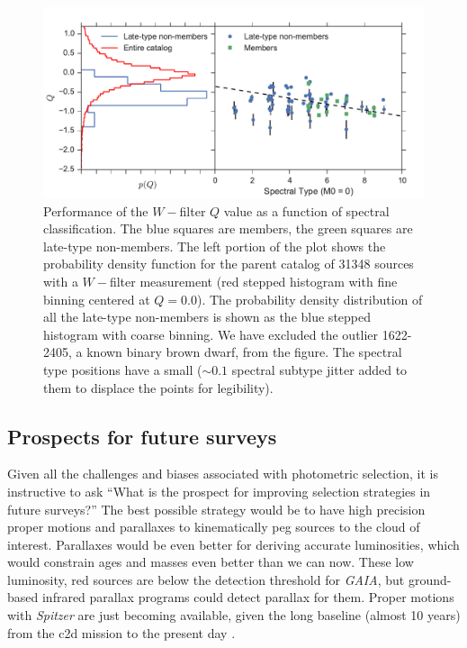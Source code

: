 \begin{figure}[ht!]
  \caption[Performance of the $W-$filter $Q$ value as a function of spectral type]{Performance of the $W-$filter $Q$ value as a function of spectral classification.  The blue squares are members, the green squares are late-type non-members.  The left portion of the plot shows the probability density function for the parent catalog of 31348 sources with a $W-$filter measurement (red stepped histogram with fine binning centered at $Q=0.0$).  The probability density distribution of all the late-type non-members is shown as the blue stepped histogram with coarse binning. We have excluded the outlier 1622-2405, a known binary brown dwarf, from the figure.  The spectral type positions have a small ($\sim0.1$ spectral subtype jitter added to them to displace the points for legibility).\label{fig_W_results} }
\centering
\includegraphics[scale=0.6]{chIMACS/figures/W_filter_results}
\end{figure}

\subsection{Prospects for future surveys}
Given all the challenges and biases associated with photometric selection, it is instructive to ask ``What is the prospect for improving selection strategies in future surveys?''  The best possible strategy would be to have high precision proper motions and parallaxes to kinematically peg sources to the cloud of interest.  Parallaxes would be even better for deriving accurate luminosities, which would constrain ages and masses even better than we can now.  These low luminosity, red sources are below the detection threshold for \emph{GAIA}, but ground-based infrared parallax programs could detect parallax for them.  Proper motions with \emph{Spitzer} are just becoming available, given the long baseline (almost 10 years) from the c2d mission to the present day \citep{2012sptz.prop90071K}.

